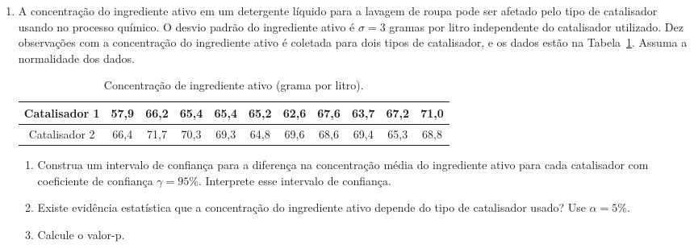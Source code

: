 \documentclass[8pt, a4paper]{article}
\begin{document}
\begin{enumerate}
	\item A concentração do ingrediente ativo em um detergente líquido para a lavagem de roupa pode ser afetado pelo tipo de catalisador usando no processo químico. O desvio padrão do ingrediente ativo é $\sigma = 3$ gramas por litro independente do catalisador utilizado. Dez observações com a concentração do ingrediente ativo é coletada para dois tipos de catalisador, e os dados estão na Tabela~\ref{tab:concentracao-detergente}. Assuma a normalidade dos dados.
	\begin{table}[ht]
		\centering
		\begin{tabular}{c|cccccccccc}
			\toprule[0.05cm]
			Catalisador 1 & 57,9 & 66,2 & 65,4 & 65,4 & 65,2 & 62,6 & 67,6 & 63,7 & 67,2 & 71,0 \\  \midrule[0.025cm]
			Catalisador 2 & 66,4 & 71,7 & 70,3 & 69,3 & 64,8 & 69,6 & 68,6 & 69,4 & 65,3 & 68,8 \\ 
			\bottomrule[0.05cm]
		\end{tabular}
		\caption{Concentração de ingrediente ativo (grama por litro).} 
		\label{tab:concentracao-detergente}
	\end{table}
	\begin{enumerate}
		\item Construa um intervalo de confiança para a diferença na concentração média do ingrediente ativo para cada catalisador com coeficiente de confiança $\gamma = 95\%$. Interprete esse intervalo de confiança.
		\item Existe evidência estatística que a concentração do ingrediente ativo depende do tipo de catalisador usado? Use $\alpha = 5\%$.
		\item Calcule o valor-p.
	\end{enumerate}


\end{enumerate}
\end{document}
